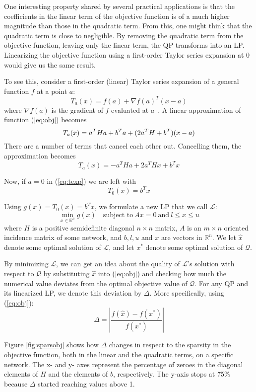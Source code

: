 One interesting property shared by several practical applications is that the
coefficients in the linear term of the objective function is of a much higher
magnitude than those in the quadratic term.
From this, one might think that the quadratic term is close to negligible.
By removing the quadratic term from the objective function, leaving only the
linear term, the QP transforms into an LP.
Linearizing the objective function using a first-order Taylor series expansion
at 0 would give us the same result.

To see this, consider a first-order (linear) Taylor series expansion of a
general function $f$ at a point $a$:
\[
T_a(x) = f(a) + \nabla f(a)^T(x-a)
\]
where $\nabla f(a)$ is the gradient of $f$ evaluated at $a$~\cite{apostol}.
A linear approximation of function (\ref{eq:obj}) becomes
\[
T_a(x) = a^THa + b^Ta + (2a^TH + b^T)(x - a) \\
\]
There are a number of terms that cancel each other out. Cancelling them,
the approximation becomes
\begin{equation}
\label{eq:texp}
T_a(x) = - a^THa + 2a^THx + b^Tx
\end{equation}

Now, if $a = 0$ in (\ref{eq:texp}) we are left with
\[
T_0(x) = b^Tx
\]

Using $g(x) = T_0(x) = b^Tx$, we formulate a new LP that we call $\mathcal{L}$:
\[
\min_{x \in \mathbb{R}^n} g(x)
\quad \textrm{subject to}
~
Ax = 0
~
\textrm{and}
~
l \le x \le u
\]
where $H$ is a positive semidefinite diagonal $n \times n$ matrix, $A$ is an
$m \times n$ oriented incidence matrix of some network, and $b, l, u$ and $x$ are vectors in
$\mathbb{R}^n$.
We let $\hat{x}$ denote some optimal solution of $\mathcal{L}$, and let $x^*$
denote some optimal solution of $\mathcal{Q}$.

By minimizing $\mathcal{L}$, we can get an idea about the quality of
$\mathcal{L}$'s solution with respect to $\mathcal{Q}$ by substituting
$\hat{x}$ into (\ref{eq:obj}) and checking how much the numerical value
deviates from the optimal objective value of $\mathcal{Q}$.
For any QP and its linearized LP, we denote this deviation by $\Delta$.
More specifically, using (\ref{eq:obj}):
\[
\Delta = \left|\frac{f(\hat{x}) - f(x^*)}{f(x^*)}\right|
\]

Figure \ref{fig:sparsobj} shows how $\Delta$ changes in respect to the sparsity
in the objective function, both in the linear and the quadratic terms, on a
specific network. The x- and y- axes represent the percentage of zeroes in the
diagonal elements of $H$ and the elements of $b$, respectively. The y-axis
stops at 75\% because $\Delta$ started reaching values above 1.

